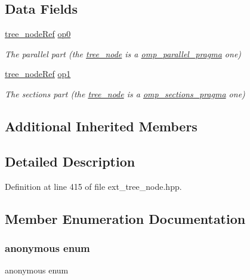\subsection*{Data Fields}
\begin{DoxyCompactItemize}
\item 
\hyperlink{tree__node_8hpp_a6ee377554d1c4871ad66a337eaa67fd5}{tree\+\_\+node\+Ref} \hyperlink{structomp__parallel__sections__pragma_a8c7f8623cb59b815575739e25041e16c}{op0}
\begin{DoxyCompactList}\small\item\em The parallel part (the \hyperlink{classtree__node}{tree\+\_\+node} is a \hyperlink{structomp__parallel__pragma}{omp\+\_\+parallel\+\_\+pragma} one) \end{DoxyCompactList}\item 
\hyperlink{tree__node_8hpp_a6ee377554d1c4871ad66a337eaa67fd5}{tree\+\_\+node\+Ref} \hyperlink{structomp__parallel__sections__pragma_a189c6528cc3490c79d0009549b7e8bfc}{op1}
\begin{DoxyCompactList}\small\item\em The sections part (the \hyperlink{classtree__node}{tree\+\_\+node} is a \hyperlink{structomp__sections__pragma}{omp\+\_\+sections\+\_\+pragma} one) \end{DoxyCompactList}\end{DoxyCompactItemize}
\subsection*{Additional Inherited Members}


\subsection{Detailed Description}


Definition at line 415 of file ext\+\_\+tree\+\_\+node.\+hpp.



\subsection{Member Enumeration Documentation}
\mbox{\label{structomp__parallel__sections__pragma_aeb4d8852304fed3518cd7fb7db2c737c}} 
\subsubsection{\texorpdfstring{anonymous enum}{anonymous enum}}
{\footnotesize\ttfamily anonymous enum}



